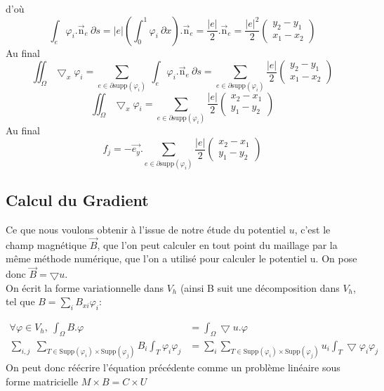 \documentclass[a4paper,12pt,titlepage]{report}
\begin{document}
\begin{onehalfspace}
\[\]
d'où
\[
	\int_{e}\varphi_{i}.\vec{\text{n}}_{e}\ \partial s =
	|e|(\int_{0}^{1}\varphi_{i}\ \partial x ).\vec{\text{n}}_{e} =
	\frac{|e|}{2}.\vec{\text{n}}_{e} = 
	\frac{|e|^{2}}{2}
	\begin{pmatrix}
		y_{2}-y_{1} \\
		x_{1}-x_{2}
	\end{pmatrix}	
\] 
Au final
\[
	\iint_{\Omega}\bigtriangledown_{x}{\varphi_{i}} =
	\sum_{e \in \partial \text{supp}(\varphi_{i})}\ \int_{e}\varphi_{i}.\vec{\text{n}}_{e}\ \partial s =
	\sum_{e \in \partial\text{supp}(\varphi_{i})}
	\frac{|e|}{2}
	\begin{pmatrix}
		y_{2}-y_{1} \\
		x_{1}-x_{2}
	\end{pmatrix}
\]
\[
	\iint_{\Omega}\bigtriangledown_{x}{\varphi_{i}} =
	\sum_{e \in \partial \text{supp}(\varphi_{i})}
	\frac{|e|}{2}
	\begin{pmatrix}
		x_{2}-x_{1} \\
		y_{1}-y_{2}
	\end{pmatrix}
\]
Au final 
\[\boxed{f_{j} =  -\vec{e_{y}}.\sum_{e \in \partial \text{supp}(\varphi_{i})}
	\frac{|e|}{2}
	\begin{pmatrix}
		x_{2}-x_{1} \\
		y_{1}-y_{2}
	\end{pmatrix}}
\]

				

\subsection{Calcul du Gradient}

Ce que nous voulons obtenir à l'issue de notre étude du potentiel $u$, c'est le champ magnétique $\vec{B}$, que l'on peut calculer en tout point du maillage par la même méthode numérique, que l'on a utilisé pour calculer le potentiel u.
\newline On pose donc  $\vec{B}= \bigtriangledown u$.
\\
\newline  On écrit la forme variationnelle dans $V_{h}$ (ainsi B suit une décomposition dans $V_h$, tel que $B=\sum_{i} B_{xi}\varphi_i:$

\[
\begin{aligned}
		\forall \varphi \in V_{h} , \ \int_{\Omega}B.  \varphi &= \int_{\Omega}\bigtriangledown u.\varphi  \\
		\sum_{i,j}\;  \sum_{T \in \text{Supp}(\varphi_{i})\times \text{Supp}(\varphi_{j})}B_{i}\int_{T} \varphi_i\varphi_j & =  \sum_{i}  \sum_{T \in \text{Supp}(\varphi_{i})\times \text{Supp}(\varphi_{j})} u_i \int_{T}\bigtriangledown\varphi_i\varphi_j  
\end{aligned}
\]
On peut donc réécrire l'équation précédente comme un problème linéaire sous forme matricielle  $M \times B=C \times U $


\end{onehalfspace}
\end{document}
